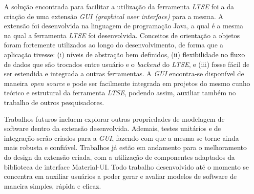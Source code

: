\documentclass[a4paper,12pt,twoside]{article}
\begin{document}

A solução encontrada para facilitar a utilização da ferramenta \textit{LTSE} foi a da criação de uma extensão \textit{GUI (graphical user interface)} para a mesma.
A extensão foi desenvolvida na linguagem de programação Java, a qual é a mesma na qual a ferramenta \textit{LTSE} foi desenvolvida.
Conceitos de orientação a objetos foram fortemente utilizados ao longo do desenvolvimento, de forma que a aplicação tivesse: (i) níveis de abstração bem definidos, (ii) flexibilidade no fluxo de dados que são trocados entre usuário e o \textit{backend} do \textit{LTSE}, e (iii) fosse fácil de ser estendida e integrada a outras ferramentas.
A \textit{GUI} encontra-se disponível de maneira \textit{open source} e pode ser facilmente integrada em projetos do mesmo cunho teórico e estrutural da ferramenta \textit{LTSE}, podendo assim, auxiliar também no trabalho de outros pesquisadores.


Trabalhos futuros incluem explorar outras propriedades de modelagem de software dentro da extensão desenvolvida.
Ademais, testes unitários e de integração serão criados para a \textit{GUI}, fazendo com que a mesma se torne ainda mais robusta e confiável.
Trabalhos já estão em andamento para o melhoramento do design da extensão criada, com a utilização de componentes adaptados da biblioteca de interface Material-UI.
Todo trabalho desenvolvido até o momento se concentra em auxiliar usuários a poder gerar e avaliar modelos de software de maneira simples, rápida e eficaz.
\end{document}
